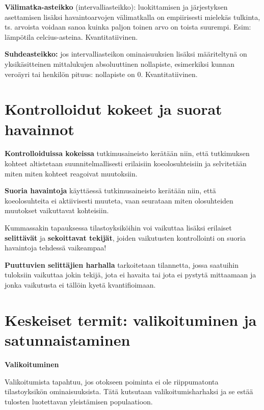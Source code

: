 \documentclass[
]{report}
\begin{document}
\textbf{Välimatka-asteikko} (intervalliasteikko): luokittamisen ja
järjestyksen asettamisen lisäksi havaintoarvojen välimatkalla on
empiirisesti mielekäs tulkinta, ts. arvoista voidaan sanoa kuinka paljon
toinen arvo on toista suurempi. Esim: lämpötila celcius-asteina.
Kvantitatiivinen.

\textbf{Suhdeasteikko:} jos intervalliasteikon ominaisuuksien lisäksi
määriteltynä on yksikäsitteinen mittalukujen absoluuttinen nollapiste,
esimerkiksi kunnan veroäyri tai henkilön pituus: nollapiste on 0.
Kvantitatiivinen.

\hypertarget{kontrolloidut-kokeet-ja-suorat-havainnot}{%
\section{Kontrolloidut kokeet ja suorat
havainnot}\label{kontrolloidut-kokeet-ja-suorat-havainnot}}

\textbf{Kontrolloiduissa kokeissa} tutkimusaineisto kerätään niin, että
tutkimuksen kohteet altistetaan suunnitelmallisesti erilaisiin
koeolosuhteisiin ja selvitetään miten miten kohteet reagoivat
muutoksiin.

\textbf{Suoria havaintoja} käyttäessä tutkimusaineisto kerätään niin,
että koeolosuhteita ei aktiivisesti muuteta, vaan seurataan miten
olosuhteiden muutokset vaikuttavat kohteisiin.

Kummassakin tapauksessa tilastoyksiköihin voi vaikuttaa lisäksi
erilaiset \textbf{selittävät} ja \textbf{sekoittavat tekijät}, joiden
vaikutusten kontrollointi on suoria havaintoja tehdessä vaikeampaa!

\textbf{Puuttuvien selittäjien harhalla} tarkoitetaan tilannetta, jossa
saatuihin tuloksiin vaikuttaa jokin tekijä, jota ei havaita tai jota ei
pystytä mittaamaan ja jonka vaikutusta ei tällöin kyetä kvantifioimaan.

\hypertarget{keskeiset-termit-valikoituminen-ja-satunnaistaminen}{%
\section{Keskeiset termit: valikoituminen ja
satunnaistaminen}\label{keskeiset-termit-valikoituminen-ja-satunnaistaminen}}

\begin{defblock}{}
\textbf{Valikoituminen}

Valikoitumista tapahtuu, jos otokseen poiminta ei ole riippumatonta
tilastoyksikön ominaisuuksista. Tätä kutsutaan valikoitumisharhaksi ja
se estää tulosten luotettavan yleistämisen populaatioon.

\end{defblock}
\end{document}

